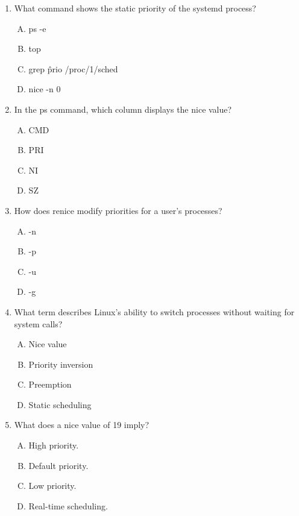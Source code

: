 \documentclass[a4paper]{report}
\begin{document}
\begin{enumerate}[1.]
    \item What command shows the static priority of the systemd process?  
    \begin{enumerate}[A)]
        \item ps -e  
        \item top  
        \item grep \^prio /proc/1/sched  
        \item nice -n 0  
    \end{enumerate}

    \item In the ps command, which column displays the nice value?  
    \begin{enumerate}[A)]
        \item CMD  
        \item PRI  
        \item NI  
        \item SZ  
    \end{enumerate}

    \item How does renice modify priorities for a user’s processes?  
    \begin{enumerate}[A)]
        \item -n  
        \item -p  
        \item -u  
        \item -g  
    \end{enumerate}

    \item What term describes Linux’s ability to switch processes without waiting for system calls?  
    \begin{enumerate}[A)]
        \item Nice value  
        \item Priority inversion  
        \item Preemption  
        \item Static scheduling  
    \end{enumerate}

    \item What does a nice value of 19 imply?  
    \begin{enumerate}[A)]
        \item High priority.  
        \item Default priority.  
        \item Low priority.  
        \item Real-time scheduling.  
    \end{enumerate}

\end{enumerate}
\newpage
\end{document}
